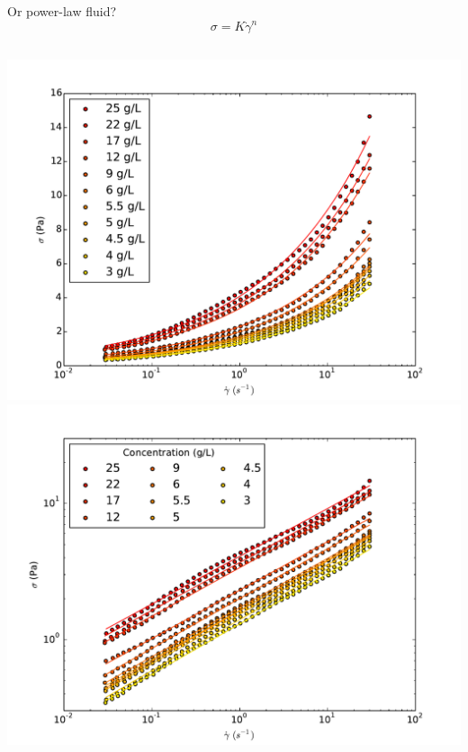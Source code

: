 \documentclass[xcolor=table]{beamer}
\begin{document}
\begin{frame}{Or power-law fluid?}
\[ \sigma = K \dot{\gamma}^n\]
\begin{columns}
\includegraphics[width=\textwidth]{Power-law_logx_r1}
\includegraphics[width=\textwidth]{Power-law_r1}
\end{columns}
\end{frame}
\end{document}
